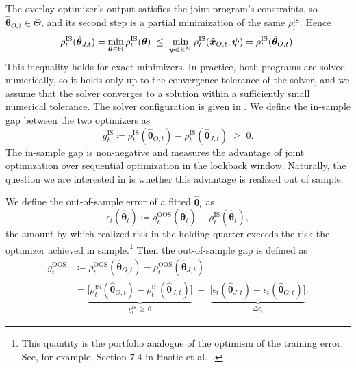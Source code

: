 The overlay optimizer's output satisfies the joint program's constraints, so $\hat{\bm{\theta}}_{O,t} \in \Theta$, and its second step is a partial minimization of the same $\rho_t^{\text{IS}}$. Hence
\begin{equation*}
\rho_t^{\text{IS}}(\hat{\bm{\theta}}_{J,t})
= \min_{\bm{\theta} \in \Theta} \rho_t^{\text{IS}}(\bm{\theta})
\;\leq\; \min_{\bm{\psi} \in \mathbb{R}^M} \rho_t^{\text{IS}}(\hat{\bm{x}}_{O,t}, \bm{\psi})
= \rho_t^{\text{IS}}(\hat{\bm{\theta}}_{O,t}).
\end{equation*}
This inequality holds for exact minimizers. In practice, both programs are solved numerically, so it holds only up to
the convergence tolerance of the solver, and we assume that the solver converges to a solution within a sufficiently
small numerical tolerance. The solver configuration is given in .
We define the in-sample gap between the two optimizers as 
\begin{equation*}
g_t^{\text{IS}} \coloneqq \rho_t^{\text{IS}}(\hat{\bm{\theta}}_{O,t}) - \rho_t^{\text{IS}}(\hat{\bm{\theta}}_{J,t}) \;\geq\; 0 .
\end{equation*}
The in-sample gap is non-negative and measures the advantage of joint optimization over sequential 
optimization in the lookback window. Naturally, the question we are interested in is whether this advantage is 
realized out of sample. 

We define the out-of-sample error of a fitted $\hat{\bm{\theta}}_t$ as
\begin{equation*}
\epsilon_t(\hat{\bm{\theta}}_t) \coloneqq \rho_t^{\text{OOS}}(\hat{\bm{\theta}}_t) - \rho_t^{\text{IS}}(\hat{\bm{\theta}}_t),
\end{equation*}
the amount by which realized risk in the holding quarter exceeds the risk the optimizer achieved in 
sample.\footnote{This quantity is the portfolio analogue of the optimism of the training error. See, for example, Section 7.4 in Hastie et al.~\cite{HastieTibshiraniFriedman2009}.} 
Then the out-of-sample gap is defined as
\begin{align*}
g_t^{\text{OOS}} &\coloneqq \rho_t^{\text{OOS}}(\hat{\bm{\theta}}_{O,t}) - \rho_t^{\text{OOS}}(\hat{\bm{\theta}}_{J,t}) \nonumber \\
        &= \underbrace{\big[\rho_t^{\text{IS}}(\hat{\bm{\theta}}_{O,t}) - \rho_t^{\text{IS}}(\hat{\bm{\theta}}_{J,t})\big]}_{g_t^{\text{IS}} \,\geq\, 0}
\;-\; \underbrace{\big[\epsilon_t(\hat{\bm{\theta}}_{J,t}) - \epsilon_t(\hat{\bm{\theta}}_{O,t})\big]}_{\Delta\epsilon_t}.
\end{align*}

